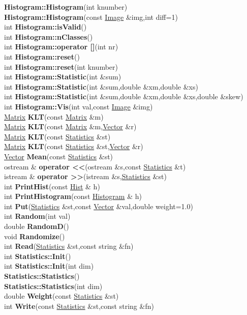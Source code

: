 \documentclass[10pt,titlepage]{article}
\def\functionlistentry#1#2#3#4#5#6{\noindent #1 {\bf #2}(#3) \dotfill #6\\}
\begin{document}
{{\functionlistentry{}{Histogram::Histogram}{int knumber}{881}{statistics}{}
\functionlistentry{}{Histogram::Histogram}{const \hyperlink{Image}{Image} \&img,int diff=1}{882}{statistics}{}
\functionlistentry{int}{Histogram::isValid}{}{885}{statistics}{}
\functionlistentry{int}{Histogram::nClasses}{}{886}{statistics}{}
\functionlistentry{int}{Histogram::operator []}{int nr}{889}{statistics}{}
\functionlistentry{int}{Histogram::reset}{}{883}{statistics}{}
\functionlistentry{int}{Histogram::reset}{int knumber}{884}{statistics}{}
\functionlistentry{int}{Histogram::Statistic}{int \&sum}{897}{statistics}{}
\functionlistentry{int}{Histogram::Statistic}{int \&sum,double \&xm,double \&xs}{898}{statistics}{}
\functionlistentry{int}{Histogram::Statistic}{int \&sum,double \&xm,double \&xs,double \&skew}{899}{statistics}{}
\functionlistentry{int}{Histogram::Vis}{int val,const \hyperlink{Image}{Image} \&img}{901}{statistics}{}
\functionlistentry{\hyperlink{Matrix}{Matrix}}{KLT}{const \hyperlink{Matrix}{Matrix} \&m}{876}{statistics}{}
\functionlistentry{\hyperlink{Matrix}{Matrix}}{KLT}{const \hyperlink{Matrix}{Matrix} \&m,\hyperlink{Vector}{Vector} \&r}{877}{statistics}{}
\functionlistentry{\hyperlink{Matrix}{Matrix}}{KLT}{const \hyperlink{Statistics}{Statistics} \&st}{878}{statistics}{}
\functionlistentry{\hyperlink{Matrix}{Matrix}}{KLT}{const \hyperlink{Statistics}{Statistics} \&st,\hyperlink{Vector}{Vector} \&r}{879}{statistics}{}
\functionlistentry{\hyperlink{Vector}{Vector}}{Mean}{const \hyperlink{Statistics}{Statistics} \&st}{868}{statistics}{}
\functionlistentry{ostream \&}{operator <<}{ostream \&s,const \hyperlink{Statistics}{Statistics} \&t}{874}{statistics}{}
\functionlistentry{istream \&}{operator >>}{istream \&s,\hyperlink{Statistics}{Statistics} \&st}{875}{statistics}{}
\functionlistentry{int}{PrintHist}{const \hyperlink{Hist}{Hist} \& h}{915}{statistics}{}
\functionlistentry{int}{PrintHistogram}{const \hyperlink{Histogram}{Histogram} \& h}{902}{statistics}{}
\functionlistentry{int}{Put}{\hyperlink{Statistics}{Statistics} \&st,const \hyperlink{Vector}{Vector} \&val,double weight=1.0}{867}{statistics}{}
\functionlistentry{int}{Random}{int val}{860}{statistics}{}
\functionlistentry{double}{RandomD}{}{861}{statistics}{}
\functionlistentry{void}{Randomize}{}{859}{statistics}{}
\functionlistentry{int}{Read}{\hyperlink{Statistics}{Statistics} \&st,const string \&fn}{873}{statistics}{}
\functionlistentry{int}{Statistics::Init}{}{865}{statistics}{}
\functionlistentry{int}{Statistics::Init}{int dim}{866}{statistics}{}
\functionlistentry{}{Statistics::Statistics}{}{863}{statistics}{}
\functionlistentry{}{Statistics::Statistics}{int dim}{864}{statistics}{}
\functionlistentry{double}{Weight}{const \hyperlink{Statistics}{Statistics} \&st}{869}{statistics}{}
\functionlistentry{int}{Write}{const \hyperlink{Statistics}{Statistics} \&st,const string \&fn}{872}{statistics}{}

}}
\end{document}
